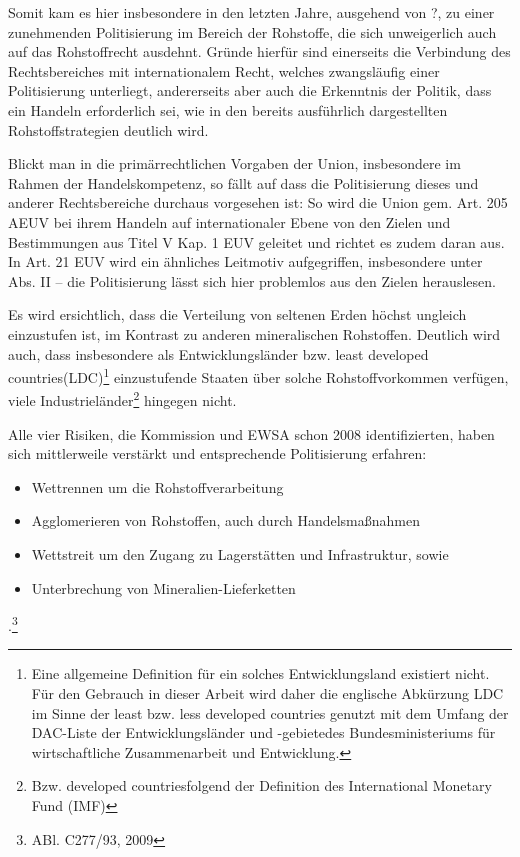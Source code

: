 \documentclass[12pt,a4paper,oneside]{book} %
\begin{document}
Somit kam es hier insbesondere in den letzten Jahre, ausgehend von ?, zu einer zunehmenden Politisierung im Bereich der Rohstoffe, die sich unweigerlich auch auf das Rohstoffrecht ausdehnt. Gründe hierfür sind einerseits die Verbindung des Rechtsbereiches mit internationalem Recht, welches zwangsläufig einer Politisierung unterliegt, andererseits aber auch die Erkenntnis der Politik, dass ein Handeln erforderlich sei, wie in den bereits ausführlich dargestellten Rohstoffstrategien deutlich wird.

Blickt man in die primärrechtlichen Vorgaben der Union, insbesondere im Rahmen der Handelskompetenz, so fällt auf dass die Politisierung dieses und anderer Rechtsbereiche durchaus vorgesehen ist: So wird die Union gem. Art. 205 AEUV bei ihrem Handeln auf internationaler Ebene von den Zielen und Bestimmungen aus Titel V Kap. 1 EUV geleitet und richtet es zudem daran aus. In Art. 21 EUV wird ein ähnliches Leitmotiv aufgegriffen, insbesondere unter Abs. II -- die Politisierung lässt sich hier problemlos aus den Zielen herauslesen.



Es wird ersichtlich, dass die Verteilung von seltenen Erden höchst ungleich einzustufen ist, im Kontrast zu anderen mineralischen Rohstoffen. Deutlich wird auch, dass insbesondere als Entwicklungsländer bzw. \glqq least developed countries\grqq (LDC)\footnote{Eine allgemeine Definition für ein solches Entwicklungsland existiert nicht. Für den Gebrauch in dieser Arbeit wird daher die englische Abkürzung LDC im Sinne der least bzw. less developed countries genutzt mit dem Umfang der \glqq DAC-Liste der Entwicklungsländer und -gebiete\grqq des Bundesministeriums für wirtschaftliche Zusammenarbeit und Entwicklung.} einzustufende Staaten über solche Rohstoffvorkommen verfügen, viele Industrieländer\footnote{Bzw. \glqq developed countries\grqq folgend der Definition des International Monetary Fund (IMF)} hingegen nicht. 

Alle vier Risiken, die Kommission und EWSA schon 2008 identifizierten, haben sich mittlerweile verstärkt und entsprechende Politisierung erfahren:
\begin{itemize}
	\item Wettrennen um die Rohstoffverarbeitung
	\item Agglomerieren von Rohstoffen, auch durch Handelsmaßnahmen
	\item Wettstreit um den Zugang zu Lagerstätten und Infrastruktur, sowie
	\item Unterbrechung von Mineralien-Lieferketten
\end{itemize}
.\footnote{ABl. C277/93, 2009}
\end{document}
